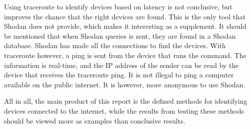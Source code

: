Using traceroute to identify devices based on latency is not conclusive, but improves the chance that the right devices are found. This is the only tool that Shodan does not provide, which makes it interesting as a supplement. It should be mentioned that when Shodan queries is sent, they are found in a Shodan database. Shodan has made all the connections to find the devices. With traceroute however, a ping is sent from the device that runs the command. The information is real-time, and the IP address of the sender can be read by the device that receives the traceroute ping. It is not illegal to ping a computer available on the public internet. It is however, more anonymous to use Shodan. 

All in all, the main product of this report is the defined methods for identifying devices connected to the internet, while the results from testing these methods should be viewed more as examples than conclusive results. 
